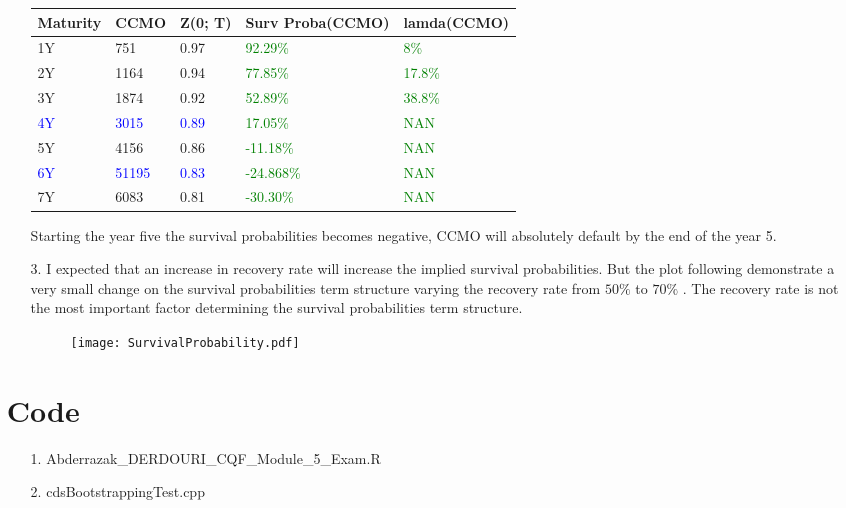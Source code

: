 \documentclass[11pt,oneside,a4paper, titlepage]{article}
\begin{document}
\begin{enumerate}
\begin{enumerate}
{
	\centering
	\begin{tabular}{|l|l|l|l|l|}
		\hline
		\small{\textbf{Maturity}} &  \small{\textbf{CCMO}} & \small{\textbf{Z(0; T)}}  & \small{\textbf{Surv Proba(CCMO)}} & \small{\textbf{lamda(CCMO)}} \\
		\hline
		1Y & 751 & 0.97  & \textcolor{green}{92.29\%} & \textcolor{green}{8\%} \\
		\hline
		2Y & 1164 & 0.94 & \textcolor{green}{77.85\%} & \textcolor{green}{17.8\%} \\
		\hline
		3Y & 1874 & 0.92 &  \textcolor{green}{52.89\%} & \textcolor{green}{38.8\%} \\
		\hline
		\textcolor{blue}{4Y} & \textcolor{blue}{3015} & \textcolor{blue}{0.89} & \textcolor{green}{17.05\%} & \textcolor{green}{NAN} \\
		\hline
		5Y & 4156 & 0.86 & \textcolor{green}{-11.18\%} & \textcolor{green}{NAN}\\
		\hline
		\textcolor{blue}{6Y} & \textcolor{blue}{51195} & \textcolor{blue}{0.83} &  \textcolor{green}{-24.868\%} & \textcolor{green}{NAN} \\
		\hline
		7Y & 6083 & 0.81 & \textcolor{green}{-30.30\%} & \textcolor{green}{NAN} \\
		\hline		
	\end{tabular}
}
\vskip 0.2cm 

Starting the year five the survival probabilities becomes negative, CCMO will absolutely default by the end of the year 5.

\item[3.]
I expected that an increase in recovery rate will increase the implied survival probabilities. But the plot following demonstrate a very small change on the survival probabilities term structure varying the recovery rate from \(50\%\) to \(70\%\) . The recovery rate is not the most important factor determining the survival probabilities term structure.

\begin{figure}[h!]
	\texttt{[image: SurvivalProbability.pdf]}
\end{figure}

\end{enumerate}

\section*{Code}
\begin{enumerate}
\item [1.] Abderrazak\_DERDOURI\_CQF\_Module\_5\_Exam.R
\item [2.] cdsBootstrappingTest.cpp
\end{enumerate}

\end{enumerate}
\end{document}
